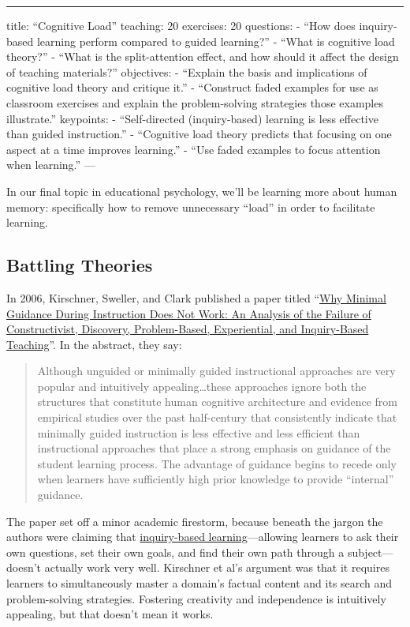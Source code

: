 \begin{center}
\rule{3in}{0.4pt}
\end{center}
title: ``Cognitive Load''
teaching: 20
exercises: 20
questions:
- ``How does inquiry-based learning perform compared to guided learning?''
- ``What is cognitive load theory?''
- ``What is the split-attention effect, and how should it affect the design of teaching materials?''
objectives:
- ``Explain the basis and implications of cognitive load theory and critique it.''
- ``Construct faded examples for use as classroom exercises and explain the problem-solving strategies those examples illustrate.''
keypoints:
- ``Self-directed (inquiry-based) learning is less effective than guided instruction.''
- ``Cognitive load theory predicts that focusing on one aspect at a time improves learning.''
- ``Use faded examples to focus attention when learning.''
---

In our final topic in educational psychology, we'll be learning more about human memory:
specifically how to remove unnecessary ``load'' in order to facilitate learning.

\subsection*{Battling Theories}

In 2006,
Kirschner, Sweller, and Clark published a paper titled
``\href{http://www.cogtech.usc.edu/publications/kirschner\_Sweller\_Clark.pdf}{Why Minimal Guidance During Instruction Does Not Work: An Analysis of the Failure of Constructivist, Discovery, Problem-Based, Experiential, and Inquiry-Based Teaching}''.
In the abstract, they say:

\begin{quote}   %
Although unguided or minimally guided instructional approaches
are very popular and intuitively appealing\ldots{}these approaches
ignore both the structures that constitute human cognitive architecture
and evidence from empirical studies over the past half-century
that consistently indicate that minimally guided instruction is less effective and less efficient than
instructional approaches that place a strong emphasis on guidance of the student learning process.
The advantage of guidance begins to recede only when learners have
sufficiently high prior knowledge to provide ``internal'' guidance.
\end{quote}   %

The paper set off a minor academic firestorm,
because beneath the jargon the authors were claiming that
\href{https://en.wikipedia.org/wiki/Inquiry-based\_learning}{inquiry-based learning}---allowing
learners to ask their own questions,
set their own goals,
and find their own path through a subject---doesn't actually work very well.
Kirschner et al's argument was that it requires learners to simultaneously
master a domain's factual content
and its search and problem-solving strategies.
Fostering creativity and independence is intuitively appealing,
but that doesn't mean it works.

